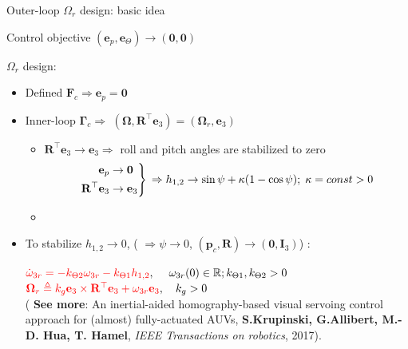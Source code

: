 \documentclass{beamer}
\begin{document}
\begin{frame}{Outer-loop $\Omega_{r}$ design: basic idea}
\begin{block}{Control objective}
	\centering
	$(\mathbf{e}_p, \mathbf{e}_\Theta) \rightarrow (\mathbf{0}, \mathbf{0})$
\end{block}
\begin{block}{$\Omega_{r}$ design:}
	\begin{itemize}
		\item \small Defined $\mathbf{F}_c \Rightarrow  \mathbf{e}_p = \mathbf{0}$ 
		\pause
		\item Inner-loop $\mathbf{\Gamma}_c \Rightarrow$  $(\mathbf{\Omega}, \mathbf{R}^\top \mathbf{e}_3) = (\mathbf{\Omega}_r, \mathbf{e}_3)$ \\
		\begin{itemize}
			\pause
			\item $\mathbf{R}^\top \mathbf{e}_3 \rightarrow \mathbf{e}_3 \Rightarrow $ roll and pitch angles are stabilized to zero	\vspace{-0.2cm}		 		
			\pause	
			\begin{equation*}	\vspace{-1.4cm}		
			\left.\begin{aligned}			
			\mathbf{e}_p & \rightarrow \mathbf{0}  \\
			\mathbf{R}^\top \mathbf{e}_3 & \rightarrow  \mathbf{e}_3
			\end{aligned}
			\right\}
			\text{$\; \Rightarrow h_{1,2} \rightarrow \sin \psi + \kappa (1-\cos \psi); \; \kappa = const >0$}
			\end{equation*}
			\item 
		\end{itemize}
	    \vspace{0.7cm}
	    \pause
		\item To stabilize $h_{1,2} \rightarrow 0$, ( $\Rightarrow \psi \rightarrow 0$, $(\mathbf{p}_c, \mathbf{R}) \rightarrow (\mathbf{0}, \mathbf{I}_3)$) : %
		
		${\color{red} \dot{\omega}_{3r} = -k_{\Theta 2} \omega_{3r} - k_{\Theta 1}h_{1,2}}, \; {\quad  \omega_{3r}(0) \in \mathbb{R}; k_{\Theta 1}, k_{\Theta 2}> 0}$\\
		${\color{red} \mathbf{\Omega}_r \triangleq k_g \mathbf{e}_3 \times \mathbf{R}^\top \mathbf{e}_3 + \omega_{3r} \mathbf{e}_3}, \quad k_g >0  $ \\	
	\vspace{0.1cm}				
	{\tiny(\color{blue} \textbf{See more}: An inertial-aided homography-based visual servoing control approach for (almost) fully-actuated AUVs, \textbf{S.Krupinski, G.Allibert, M.-D. Hua, T. Hamel}, \textit{IEEE Transactions on robotics}, 2017).}
	\end{itemize}
\end{block}	
\end{frame}
\end{document}
